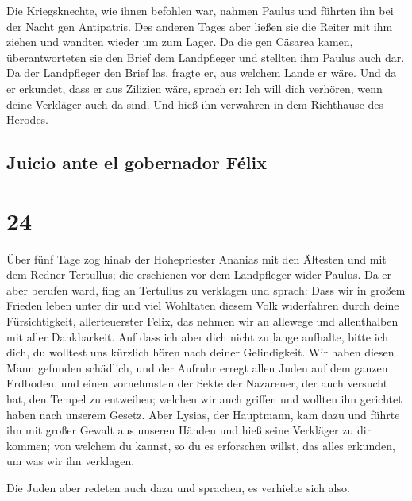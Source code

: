  Die Kriegsknechte, wie ihnen befohlen war, nahmen Paulus
und führten ihn bei der Nacht gen Antipatris.  Des
anderen Tages aber ließen sie die Reiter mit ihm ziehen und wandten
wieder um zum Lager.  Da die gen Cäsarea kamen,
überantworteten sie den Brief dem Landpfleger und stellten ihm Paulus
auch dar.  Da der Landpfleger den Brief las, fragte er,
aus welchem Lande er wäre. Und da er erkundet, dass er aus Zilizien
wäre, sprach er:  Ich will dich verhören, wenn deine
Verkläger auch da sind. Und hieß ihn verwahren in dem Richthause des
Herodes.

\hypertarget{juicio-ante-el-gobernador-fuxe9lix}{%
\subsection{Juicio ante el gobernador
Félix}\label{juicio-ante-el-gobernador-fuxe9lix}}

\hypertarget{section-23}{%
\section{24}\label{section-23}}

 Über fünf Tage zog hinab der Hohepriester Ananias mit den
Ältesten und mit dem Redner Tertullus; die erschienen vor dem
Landpfleger wider Paulus.  Da er aber berufen ward, fing
an Tertullus zu verklagen und sprach:  Dass wir in großem
Frieden leben unter dir und viel Wohltaten diesem Volk widerfahren durch
deine Fürsichtigkeit, allerteuerster Felix, das nehmen wir an allewege
und allenthalben mit aller Dankbarkeit.  Auf dass ich aber
dich nicht zu lange aufhalte, bitte ich dich, du wolltest uns kürzlich
hören nach deiner Gelindigkeit.  Wir haben diesen Mann
gefunden schädlich, und der Aufruhr erregt allen Juden auf dem ganzen
Erdboden, und einen vornehmsten der Sekte der Nazarener, 
der auch versucht hat, den Tempel zu entweihen; welchen wir auch griffen
und wollten ihn gerichtet haben nach unserem Gesetz.  Aber
Lysias, der Hauptmann, kam dazu und führte ihn mit großer Gewalt aus
unseren Händen  und hieß seine Verkläger zu dir kommen;
von welchem du kannst, so du es erforschen willst, das alles erkunden,
um was wir ihn verklagen.

 Die Juden aber redeten auch dazu und sprachen, es
verhielte sich also.

